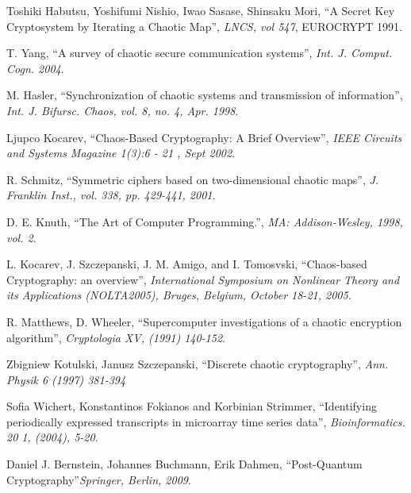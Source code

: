 \documentclass{iitgthesis}
\begin{document}
%
\begin{thebibliography}{11}
\begin{small}

Toshiki Habutsu, Yoshifumi Nishio, Iwao Sasase, Shinsaku Mori, ``A Secret Key Cryptosystem by Iterating a Chaotic Map'', {\em LNCS, vol 547}, EUROCRYPT 1991.

T. Yang, ``A survey of chaotic secure communication systems'', {\em Int. J. Comput. Cogn. 2004}.

M. Hasler, ``Synchronization of chaotic systems and transmission of information'', {\em Int. J. Bifursc. Chaos, vol. 8, no. 4, Apr. 1998}.

Ljupco Kocarev, ``Chaos-Based Cryptography: A Brief Overview'', {\em IEEE Circuits and Systems Magazine 1(3):6 - 21 , Sept 2002}.

R. Schmitz, ``Symmetric ciphers based on two-dimensional chaotic maps'', {\em J. Franklin Inst., vol. 338, pp. 429-441, 2001}.

D. E. Knuth, ``The Art of Computer Programming.'', {\em MA: Addison-Wesley, 1998, vol. 2}.

L. Kocarev, J. Szczepanski, J. M. Amigo, and I. Tomosvski, ``Chaos-based Cryptography: an overview'', {\em International Symposium on Nonlinear Theory and its Applications (NOLTA2005), Bruges, Belgium, October 18-21, 2005.
}

R. Matthews, D. Wheeler, ``Supercomputer investigations of a chaotic encryption algorithm'', {\em Cryptologia XV, (1991) 140-152}.

Zbigniew Kotulski, Janusz Szczepanski, ``Discrete chaotic cryptography'', {\em Ann. Physik 6 (1997) 381-394}

Sofia Wichert, Konstantinos Fokianos and Korbinian Strimmer, ``Identifying periodically expressed transcripts in microarray time series data'', {\em Bioinformatics. 20 1, (2004), 5-20}.

Daniel J. Bernstein, Johannes Buchmann, Erik Dahmen, ``Post-Quantum Cryptography''{\em Springer, Berlin, 2009}.


\end{small}
\end{thebibliography}
\end{document}
